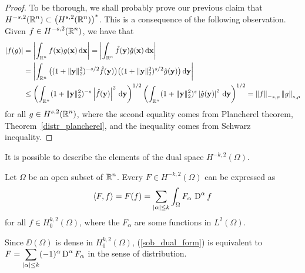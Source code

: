 \begin{proof}
To be thorough, we shall probably prove our previous claim that
$\displaystyle H^{-s,2}(\mathbb{R}^n) \subset \big(H^{s,2}(\mathbb{R}^n)\big)^\ast$.
This is a consequence of the following observation.
Given $\displaystyle f \in H^{-s,2}(\mathbb{R}^n)$, we have that
\begin{align*}
|f(g)| &= \left| \int_{\mathbb{R}^n} f(\mathbf{x}) g(\mathbf{x}) \,\mathrm{d}{\mathbf{x}} \right|
= \left| \int_{\mathbb{R}^n} \hat{f}(\mathbf{y}) \hat{g}(\mathbf{x}) \,\mathrm{d}{\mathbf{x}} \right| \\
&= \left| \int_{\mathbb{R}^n} \big( (1+\|\mathbf{y}\|_2^2)^{-s/2}\hat{f}(\mathbf{y})\big)
\big( (1+\|\mathbf{y}\|_2^2)^{s/2} \hat{g}(\mathbf{y}) \big) \,\mathrm{d}{\mathbf{y}} \right| \\
&\leq \left( \int_{\mathbb{R}^n} (1+\|\mathbf{y}\|_2^2)^{-s}
\left|\hat{f}(\mathbf{y})\right|^2 \,\mathrm{d}{\mathbf{y}} \right)^{1/2}
\left( \int_{\mathbb{R}^n} (1+\|\mathbf{y}\|_2^2)^s\left|\hat{g}(\mathbf{y})\right|^2
\,\mathrm{d}{\mathbf{y}} \right)^{1/2}
= \left\| f\right\|_{-s,\rho} \left\| g \right\|_{s,\rho} 
\end{align*}
for all $\displaystyle g \in H^{s,2}(\mathbb{R}^n)$, where the second
equality comes from Plancherel theorem,
Theorem~\ref{distr_plancherel}, and the inequality comes from Schwarz
inequality.
\end{proof}

It is possible to describe the elements of the dual space
$\displaystyle H^{-k,2}(\Omega)$.

\begin{theorem}
Let $\Omega$ be an open subset of $\displaystyle \mathbb{R}^n$.  Every
$\displaystyle F\in H^{-k,2}(\Omega)$ can be expressed as
\begin{equation} \label{sob_dual_form}
\left\langle{F} , {f}\right\rangle = F(f) = \sum_{|\alpha|\leq k} \int_\Omega F_\alpha \,\operatorname{D}^\alpha f
\end{equation}
for all $\displaystyle f \in H^{k,2}_0(\Omega)$, where the $F_\alpha$
are some functions in $\displaystyle L^2(\Omega)$.
\end{theorem}

\begin{rmk}
Since $\DD(\Omega)$ is dense in $\displaystyle H^{k,2}_0(\Omega)$,
(\ref{sob_dual_form}) is equivalent to
$\displaystyle F = \sum_{|\alpha|\leq k} (-1)^\alpha \operatorname{D}^\alpha F_\alpha$
in the sense of distribution.
\end{rmk}

